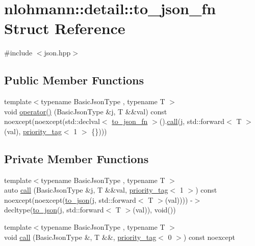 \hypertarget{structnlohmann_1_1detail_1_1to__json__fn}{}\section{nlohmann\+:\+:detail\+:\+:to\+\_\+json\+\_\+fn Struct Reference}
\label{structnlohmann_1_1detail_1_1to__json__fn}


{\ttfamily \#include $<$json.\+hpp$>$}

\subsection*{Public Member Functions}
\begin{DoxyCompactItemize}
\item 
{\footnotesize template$<$typename Basic\+Json\+Type , typename T $>$ }\\void \hyperlink{structnlohmann_1_1detail_1_1to__json__fn_ac63f82d3eed085522f1cbe99a521a4d4}{operator()} (Basic\+Json\+Type \&j, T \&\&val) const noexcept(noexcept(std\+::declval$<$ \hyperlink{structnlohmann_1_1detail_1_1to__json__fn}{to\+\_\+json\+\_\+fn} $>$().\hyperlink{structnlohmann_1_1detail_1_1to__json__fn_ada2ce804ebf3b55f6e3e46ff3a055394}{call}(j, std\+::forward$<$ T $>$(val), \hyperlink{structnlohmann_1_1detail_1_1priority__tag}{priority\+\_\+tag}$<$ 1 $>$ \{\})))
\end{DoxyCompactItemize}
\subsection*{Private Member Functions}
\begin{DoxyCompactItemize}
\item 
{\footnotesize template$<$typename Basic\+Json\+Type , typename T $>$ }\\auto \hyperlink{structnlohmann_1_1detail_1_1to__json__fn_ada2ce804ebf3b55f6e3e46ff3a055394}{call} (Basic\+Json\+Type \&j, T \&\&val, \hyperlink{structnlohmann_1_1detail_1_1priority__tag}{priority\+\_\+tag}$<$ 1 $>$) const noexcept(noexcept(\hyperlink{namespacenlohmann_1_1detail_a1a804b98cbe89b7e44b698f2ca860490}{to\+\_\+json}(j, std\+::forward$<$ T $>$(val)))) -\/$>$ decltype(\hyperlink{namespacenlohmann_1_1detail_a1a804b98cbe89b7e44b698f2ca860490}{to\+\_\+json}(j, std\+::forward$<$ T $>$(val)), void())
\item 
{\footnotesize template$<$typename Basic\+Json\+Type , typename T $>$ }\\void \hyperlink{structnlohmann_1_1detail_1_1to__json__fn_adbd2247cecd3cdd072f9a28ef84e85f4}{call} (Basic\+Json\+Type \&, T \&\&, \hyperlink{structnlohmann_1_1detail_1_1priority__tag}{priority\+\_\+tag}$<$ 0 $>$) const noexcept
\end{DoxyCompactItemize}


